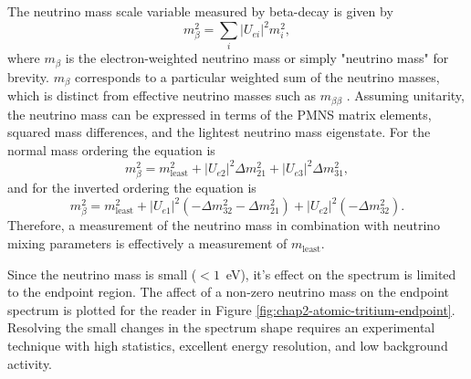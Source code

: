 The neutrino mass scale variable measured by beta-decay is given by 
\begin{equation}
    m_\beta^2=\sum_i{|U_{ei}|^2}m_i^2,
\end{equation}
where $m_\beta$ is the electron-weighted neutrino mass or simply "neutrino mass" for brevity. $m_\beta$ corresponds to a particular weighted sum of the neutrino masses, which is distinct from effective neutrino masses such as $m_{\beta\beta}$ \cite{FORMAGGIO20211}. Assuming unitarity, the neutrino mass can be expressed in terms of the PMNS matrix elements, squared mass differences, and the lightest neutrino mass eigenstate. For the normal mass ordering the equation is
\begin{equation}
    m_\beta^2=m^2_\textrm{least} + |U_{e2}|^2\Delta m_{21}^2 +|U_{e3}|^2\Delta m_{31}^2,
\end{equation} 
and for the inverted ordering the equation is 
\begin{equation}
    m_\beta^2=m^2_\textrm{least}+|U_{e1}|^2(-\Delta m_{32}^2-\Delta m_{21}^2)+|U_{e2}|^2(-\Delta m_{32}^2).
\end{equation}
Therefore, a measurement of the neutrino mass in combination with neutrino mixing parameters is effectively a measurement of $m_\textrm{least}$.

Since the neutrino mass is small ($<1$~eV), it's effect on the spectrum is limited to the endpoint region. The affect of a non-zero neutrino mass on the endpoint spectrum is plotted for the reader in Figure \ref{fig:chap2-atomic-tritium-endpoint}. Resolving the small changes in the spectrum shape requires an experimental technique with high statistics, excellent energy resolution, and low background activity. 

